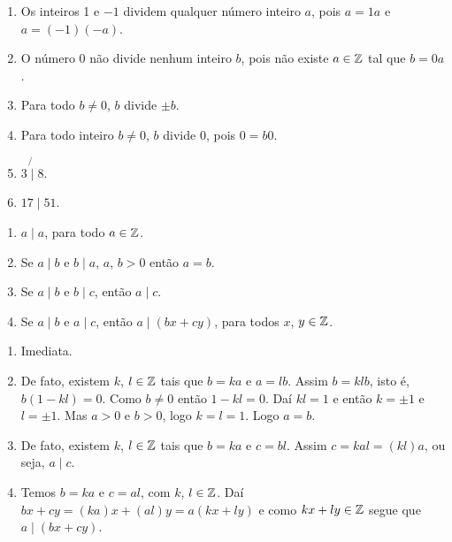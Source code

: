 \begin{exemplos}
    \begin{enumerate}[label={\arabic*})]
        \item Os inteiros 1 e $-1$ dividem qualquer número inteiro $a$, pois $a = 1 a$ e $a = (-1)(-a)$.
        \item O número 0 não divide nenhum inteiro $b$, pois não existe $a \in \mathbb{Z}$ tal que $b = 0a$.
        \item Para todo $b\neq 0$, $b$ divide $\pm b$.
        \item Para todo inteiro $b\neq 0$, $b$ divide 0, pois $0 = b0$.
        \item $3 \not{\mid} 8$.
        \item $17 \mid 51$.
    \end{enumerate}
\end{exemplos}

\begin{proposicao}
    \begin{enumerate}[label={\roman*})]
        \item $a\mid a$, para todo $a \in \mathbb{Z}$.
        \item Se $a\mid b$ e $b\mid a$, $a$, $b > 0$ então $a = b$.
        \item Se $a\mid b$ e $b\mid c$, então $a\mid c$.
        \item Se $a\mid b$ e $a\mid c$, então $a\mid (bx+cy)$, para todos $x$, $y \in \mathbb{Z}$.
    \end{enumerate}
\end{proposicao}
\begin{prova}
    \begin{enumerate}[label={\roman*})]
        \item Imediata.

        \item De fato, existem $k$, $l \in \mathbb{Z} $ tais que $b = ka$ e $a = lb$. Assim $b = klb$, isto é, $b(1 - kl) = 0$.
        Como $b \ne 0$ então $1 - kl = 0$. Daí $kl = 1$ e então $k = \pm 1$ e $l = \pm 1$. Mas $a > 0$ e $b > 0$, logo $k = l =1$. Logo $a = b$.

        \item De fato, existem $k$, $l \in \mathbb{Z}$ tais que $b = ka$ e $c = bl$. Assim  $c = kal = (kl)a$, ou seja, $a\mid c$.

        \item Temos $b = ka$ e $c = al$, com $k$, $l \in \mathbb{Z}$. Daí $bx + cy = (ka)x + (al)y = a(kx + ly)$ e como $kx + ly \in \mathbb{Z}$ segue que $a \mid (bx + cy)$.
    \end{enumerate}
\end{prova}


